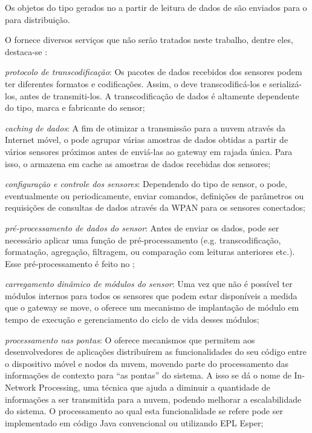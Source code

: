 Os objetos do tipo \sensordata gerados no \stwopa a partir de leitura de dados de \smartobjs são enviados para o \cddl para distribuição.

O \mhub fornece diversos serviços que não serão tratados neste trabalho, dentre eles, destaca-se \cite{gomes:2017}:

\begin{alineas}
	\item \emph{protocolo de transcodificação}:
		Os pacotes de dados recebidos dos sensores podem ter diferentes formatos e codificações.  Assim, o \mhub deve transcodificá-los e serializá-los, antes de transmiti-los. A transcodificação de dados é altamente dependente do tipo, marca e fabricante do sensor;
		
	\item \emph{caching de dados}:
		A fim de otimizar a transmissão para a nuvem através da Internet móvel, o \mhub pode agrupar várias amostras de dados obtidas a partir de vários sensores próximos antes de enviá-las ao gateway em rajada única. Para isso, o \mhub armazena em cache as amostras de dados recebidas dos sensores;
		
	\item \emph{configuração e controle dos sensores}:
		Dependendo do tipo de sensor, o \mhub pode, eventualmente ou periodicamente, enviar comandos, definições de parâmetros ou requisições de consultas de dados através da WPAN para os sensores conectados;
		
	\item \emph{pré-processamento de dados do sensor}:
		Antes de enviar os dados, pode ser necessário aplicar uma função de pré-processamento (e.g.  transcodificação, formatação, agregação, filtragem, ou comparação com leituras anteriores etc.).  Esse pré-processamento é feito no \mhub;
		
	\item \emph{carregamento dinâmico de módulos do sensor}:
		Uma vez que não é possível ter módulos internos para todos os sensores que podem estar disponíveis a medida que o gateway se move, o \mhub oferece um mecanismo de implantação de módulo em tempo de execução e gerenciamento do ciclo de vida desses módulos;
		
	\item \emph{processamento nas pontas}:
		O \mhub oferece mecanismos que permitem aos desenvolvedores de aplicações distribuírem as funcionalidades do seu código entre o dispositivo móvel e nodos da nuvem, movendo parte do processamento das informações de contexto para “as pontas” do sistema. A isso se dá o nome de In-Network Processing, uma técnica que ajuda a diminuir a quantidade de informações a ser transmitida para a nuvem, podendo melhorar a escalabilidade do sistema. O processamento ao qual esta funcionalidade se refere pode ser implementado em código Java convencional ou utilizando EPL Esper;
		

\end{alineas}
